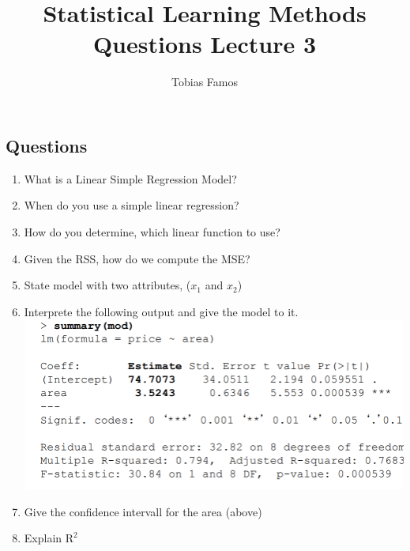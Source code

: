 \documentclass[11pt]{article}
\title{Statistical Learning Methods \\ Questions Lecture 3}
\author{Tobias Famos}
\begin{document}
    \maketitle
    \subsection*{Questions}
    \begin{enumerate}
        \item What is a Linear Simple Regression Model?
        \item When do you use a simple linear regression?
        \item How do you determine, which linear function to use?
        \item Given the RSS, how do we compute the MSE?
        \item State model with two attributes, ($x_1$ and $x_2$)
        \item Interprete the following output and give the model to it. \\
        \includegraphics[scale=0.3]{pictures/linreg1}
        \item Give the confidence intervall for the area (above)
        \item Explain $\text{R}^2$
    \end{enumerate}
    \newpage
\end{document}
